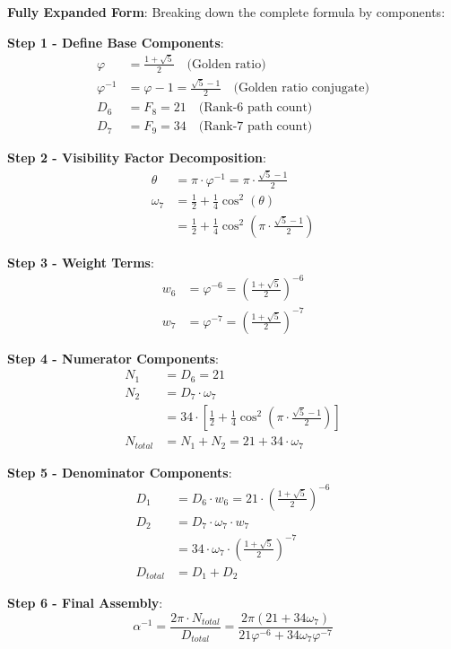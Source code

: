 \documentclass[%
 reprint,
 amsmath,amssymb,
 aps,
 prd,
 10pt,
 nofootinbib,      %
 longbibliography  %
]{revtex4-2}
\theoremstyle{definition}
\theoremstyle{remark}
\begin{document}
\textbf{Fully Expanded Form}: Breaking down the complete formula by components:

\textbf{Step 1 - Define Base Components}:
\begin{align}
\varphi &= \frac{1+\sqrt{5}}{2} \quad \text{(Golden ratio)} \\
\varphi^{-1} &= \varphi - 1 = \frac{\sqrt{5}-1}{2} \quad \text{(Golden ratio conjugate)} \\
D_6 &= F_8 = 21 \quad \text{(Rank-6 path count)} \\
D_7 &= F_9 = 34 \quad \text{(Rank-7 path count)}
\end{align}

\textbf{Step 2 - Visibility Factor Decomposition}:
\begin{align}
\theta &= \pi \cdot \varphi^{-1} = \pi \cdot \frac{\sqrt{5}-1}{2} \\
\omega_7 &= \frac{1}{2} + \frac{1}{4}\cos^2(\theta) \\
&= \frac{1}{2} + \frac{1}{4}\cos^2\left(\pi \cdot \frac{\sqrt{5}-1}{2}\right)
\end{align}

\textbf{Step 3 - Weight Terms}:
\begin{align}
w_6 &= \varphi^{-6} = \left(\frac{1+\sqrt{5}}{2}\right)^{-6} \\
w_7 &= \varphi^{-7} = \left(\frac{1+\sqrt{5}}{2}\right)^{-7}
\end{align}

\textbf{Step 4 - Numerator Components}:
\begin{align}
N_1 &= D_6 = 21 \\
N_2 &= D_7 \cdot \omega_7 \\
&= 34 \cdot \left[\frac{1}{2} + \frac{1}{4}\cos^2\left(\pi \cdot \frac{\sqrt{5}-1}{2}\right)\right] \\
N_{total} &= N_1 + N_2 = 21 + 34 \cdot \omega_7
\end{align}

\textbf{Step 5 - Denominator Components}:
\begin{align}
D_1 &= D_6 \cdot w_6 = 21 \cdot \left(\frac{1+\sqrt{5}}{2}\right)^{-6} \\
D_2 &= D_7 \cdot \omega_7 \cdot w_7 \\
&= 34 \cdot \omega_7 \cdot \left(\frac{1+\sqrt{5}}{2}\right)^{-7} \\
D_{total} &= D_1 + D_2
\end{align}

\textbf{Step 6 - Final Assembly}:
\begin{equation}
\boxed{
\alpha^{-1} = \frac{2\pi \cdot N_{total}}{D_{total}} = \frac{2\pi(21 + 34 \omega_7)}{21 \varphi^{-6} + 34 \omega_7 \varphi^{-7}}
}
\end{equation}
\end{document}

